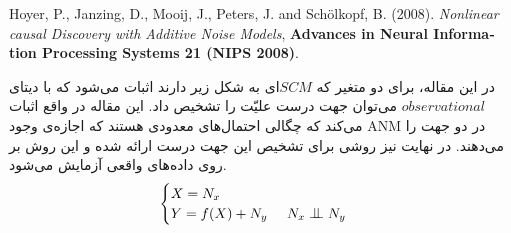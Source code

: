 \documentclass{article}
\begin{document}
\begin{enumerate}
	
\begin{latin}
Hoyer, P., Janzing, D., Mooij, J., Peters, J. and Sch{\"o}lkopf, B.  (2008).
\textit{Nonlinear causal Discovery with Additive Noise Models}, \textbf{Advances  in  Neural  Information  Processing  Systems 21 (NIPS 2008)}.
\end{latin}
در این مقاله، برای دو متغیر که $SCM$ای به شکل زیر دارند اثبات می‌شود که با دیتای $observational$ می‌توان جهت درست علیّت را تشخیص داد.  این مقاله در واقع اثبات می‌کند که چگالی احتمال‌های معدودی هستند که اجازه‌ی وجود  ANM در دو جهت را می‌دهند. در نهایت نیز روشی برای تشخیص این جهت درست ارائه شده و این روش بر روی داده‌های واقعی آزمایش می‌شود.
\begin{equation}
\begin{cases}
X = N_x \\
Y = f(X) + N_y \;\;\;\;\; N_x \bigCI N_y
\end{cases}
\end{equation}


\end{enumerate}
\end{document}

